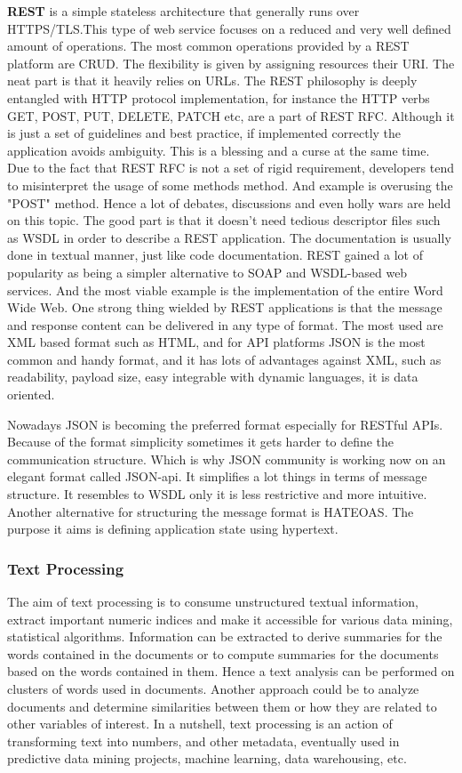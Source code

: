 \textbf{REST} is a simple stateless architecture that generally runs over HTTPS/TLS.This type of web service focuses on a reduced and very well defined amount of operations. The most common operations provided by a REST platform are CRUD. The flexibility is given by assigning resources their URI. The neat part is that it heavily relies on URLs. The REST philosophy is deeply entangled with HTTP protocol implementation, for instance the HTTP verbs GET, POST, PUT, DELETE, PATCH etc, are a part of REST RFC. Although it is just a set of guidelines and best practice, if implemented correctly the application avoids ambiguity. This is a blessing and a curse at the same time. Due to the fact that REST RFC is not a set of rigid requirement, developers tend to misinterpret the usage of some methods method. And example is overusing the "POST" method. Hence a lot of debates, discussions and even holly wars are held on this topic. The good part is that it doesn't need tedious descriptor files such as WSDL in order to describe a REST application. The documentation is usually done in textual manner, just like code documentation. REST gained a lot of popularity as being a simpler alternative to SOAP and WSDL-based web services. And the most viable example is the implementation of the entire Word Wide Web. One strong thing wielded by REST applications is that the message and response content can be delivered in any type of format. The most used are XML based format such as HTML, and for API platforms JSON is the most common and handy format, and it has lots of advantages against XML, such as readability, payload size, easy integrable with dynamic languages, it is data oriented.

Nowadays JSON is becoming the preferred format especially for RESTful APIs. Because of the format simplicity sometimes it gets harder to define the communication structure. Which is why JSON community is working now on an elegant format called JSON-api. It simplifies a lot things in terms of message structure. It resembles to WSDL only it is less restrictive and more intuitive. Another alternative for structuring the message format is HATEOAS. The purpose it aims is defining application state using hypertext.

\subsubsection{Text Processing}
The aim of text processing is to consume unstructured textual information, extract important numeric indices and make it accessible for various data mining, statistical algorithms. Information can be extracted to derive summaries for the words contained in the documents or to compute summaries for the documents based on the words contained in them. Hence a text analysis can be performed on clusters of words used in documents. Another approach could be to analyze documents and determine similarities between them or how they are related to other variables of interest. In a nutshell, text processing is an action of transforming text into numbers, and other metadata, eventually used in predictive data mining projects, machine learning, data warehousing, etc.

